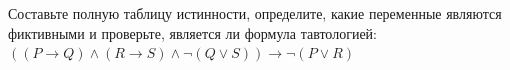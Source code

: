 \question Составьте полную таблицу истинности, определите, какие переменные являются фиктивными и проверьте, является ли формула тавтологией:
$((P \rightarrow Q) \land (R \rightarrow S) \land \neg (Q \lor S)) \rightarrow \neg (P \lor R)$